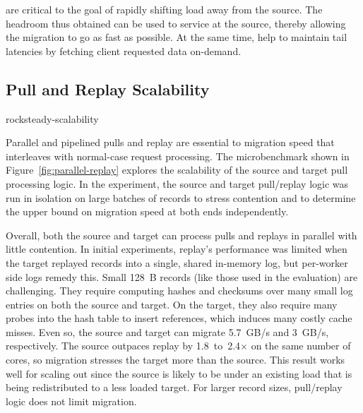 \priopulls are critical to the goal of
rapidly shifting load away from the source. The headroom thus
obtained can be used to service \pulls at the source, thereby allowing
the migration to go as fast as possible. At the same time, \priopulls
help to maintain tail latencies by fetching client requested data
on-demand.

\subsection{Pull and Replay Scalability}
\label{sec:eval-replay}

 {rocksteady-scalability}

Parallel and pipelined pulls and replay are essential to migration speed that
interleaves with normal-case request processing. The microbenchmark shown in
Figure~\ref{fig:parallel-replay} explores the scalability of the source and
target pull processing logic. In the experiment, the source and target
pull/replay logic was run in isolation on large batches of records to stress
contention and to determine the upper bound on migration speed at both ends
independently.

Overall, both the source and target can process pulls and replays in parallel with
little contention. In initial experiments, replay's performance was limited when the
target replayed records into a single, shared in-memory log, but per-worker side logs
remedy this. Small 128~B records (like those used in the evaluation) are
challenging. They require computing hashes and checksums over many small log
entries on both the source and target. On the target, they also require many
probes into the hash table to insert references, which induces many costly
cache misses. Even so, the source and target can migrate 5.7~GB/s and
3~GB/s,
respectively. The source outpaces replay by 1.8~to~2.4$\times$ on the
same number of cores, so migration stresses the target more than the source.
This result works well for scaling out since the source is likely to be under an
existing load that is being redistributed to a less loaded target. For larger
record sizes, pull/replay logic does not limit migration.

